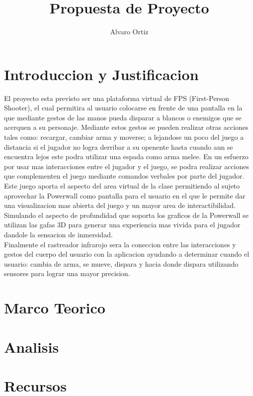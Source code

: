 \documentclass[11pt]{article} %
\title{Propuesta de Proyecto}
\author{Alvaro Ortiz}
\begin{document}
\maketitle

\section{Introduccion y Justificacion}
El proyecto esta previsto ser una plataforma virtual de FPS (First-Person Shooter), el cual permitira al usuario colocarse en frente de una pantalla en la que mediante gestos de las manos pueda disparar a blancos o enemigos que se acerquen a su personaje. Mediante estos gestos se pueden realizar otras acciones tales como: recargar, cambiar arma y moverse; a lejandose un poco del juego a distancia si el jugador no logra derribar a su openente hasta cuando aun se encuentra lejos este podra utilizar una espada como arma melee. En un esfuerzo por usar mas interacciones entre el jugador y el juego, se podra realizar acciones que complementen el juego mediante comandos verbales por parte del jugador.\\

Este juego aporta el aspecto del area virtual de la clase permitiendo al sujeto aprovechar la Powerwall como pantalla para el usuario en el que le permite dar una visualizacion mas abierta del juego y un mayor area de interactibilidad. Simulando el aspecto de profundidad que soporta los graficos de la Powerwall se utilizan las gafas 3D para generar una experiencia mas vivida para el jugador dandole la sensacion de inmersidad.\\

Finalmente el rastreador infrarojo sera la coneccion entre las interacciones y gestos del cuerpo del usuario con la aplicacion ayudando a determinar cuando el usuario: cambia de arma, se mueve, dispara y hacia donde dispara utilizando sensores para lograr una mayor precision.

\section{Marco Teorico}
\section{Analisis}
\section {Recursos}
\end{document}
